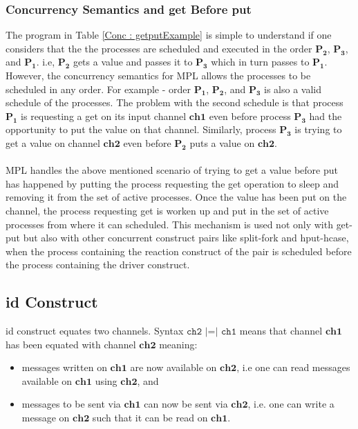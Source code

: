 \documentclass[11pt]{article}
\newcommand{\<}{\langle}
\renewcommand{\>}{\rangle}
\begin{document}
\subsubsection {Concurrency Semantics and get Before put}
The program in Table \ref {Conc : getputExample} is simple to understand if one considers that the the processes are scheduled and executed in the order $\mathbf {P_2}$, $\mathbf {P_3}$, and $\mathbf {P_1}$. i.e, $\mathbf {P_2}$ gets a value and passes it to $\mathbf {P_3}$ which in turn passes to $\mathbf {P_1}$. However, the concurrency semantics for MPL allows the processes to be scheduled in any order. For example - order $\mathbf {P_1}$, $\mathbf {P_2}$, and $\mathbf {P_3}$ is also a valid schedule of the processes. The problem with the second schedule is that process $\mathbf {P_1}$ is requesting a get on its input channel $\mathbf {ch1}$ even before process $\mathbf {P_3}$ had the opportunity to put the value on that channel. Similarly, process $\mathbf {P_3}$ is trying to get a value on channel $\mathbf {ch2}$ even before $\mathbf {P_2}$ puts a value on $\mathbf {ch2}$. 
~~\\~~\\ 
MPL handles the above mentioned scenario of trying to get a value before put has happened by putting the process requesting the get operation to sleep and removing it from the set of active processes. Once the value has been put on the channel, the process requesting get is worken up and put in the set of active processes from where it can scheduled. This mechanism is used not only with {\sf get-put} but also with other concurrent construct pairs like {\sf split-fork} and {\sf hput-hcase}, when the process containing the reaction construct of the pair is scheduled before the process containing the driver construct.
\subsection {id Construct}
{\sf id} construct equates two channels. Syntax $\mathbf {\texttt{ch2~|=|~ch1}}$ means that channel $\mathbf{ch1}$ has been equated with channel $\mathbf{ch2}$ meaning:

\begin{itemize}
  \item messages written on $\mathbf{ch1}$ are now available on $\mathbf{ch2}$, i.e one can read messages available on $\mathbf{ch1}$ using $\mathbf{ch2}$, and
  \item messages to be sent via $\mathbf{ch1}$ can now be sent via $\mathbf{ch2}$, i.e. one can write a message on $\mathbf{ch2}$ such that it can be read on $\mathbf{ch1}$.
\end{itemize}
\end{document}

